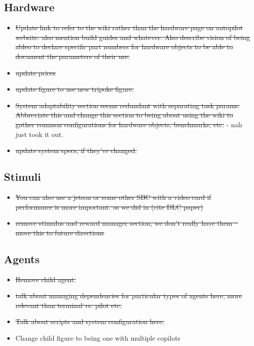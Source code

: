 \subsection{Hardware}

\begin{itemize}
\item \sout{Update link to refer to the wiki rather than the hardware page on autopilot website. also mention build guides and whatever. Also describe vision of being ableo to declare specific part numbers for hardware objects to be able to document the parameters of their use.}
\item \sout{update prices}
\item \sout{update figure to use new tripoke figure.}
\item \sout{System adaptability section seems redundant with separating task params. Abbreviate this and change this section to being about using the wiki to gather common configurations for hardware objects, benchmarks, etc.} - nah just took it out.
\item \sout{update system specs, if they've changed.}
\end{itemize}

\subsection{Stimuli}

\begin{itemize}
\item \sout{You can also use a jetson or some other SBC with a video card if performance is more important. as we did in (cite DLC paper)}
\item \sout{remove stimulus and reward manager section, we don't really have them -- move this to future directions}
\end{itemize}

\subsection{Agents}

\begin{itemize}
\item \sout{Remove child agent.}
\item \sout{talk about managing dependencies for particular types of agents here, more relevant than terminal vs. pilot etc.}
\item \sout{Talk about scripts and system configuration here.}
\item Change child figure to being one with multiple copilots
\end{itemize}

